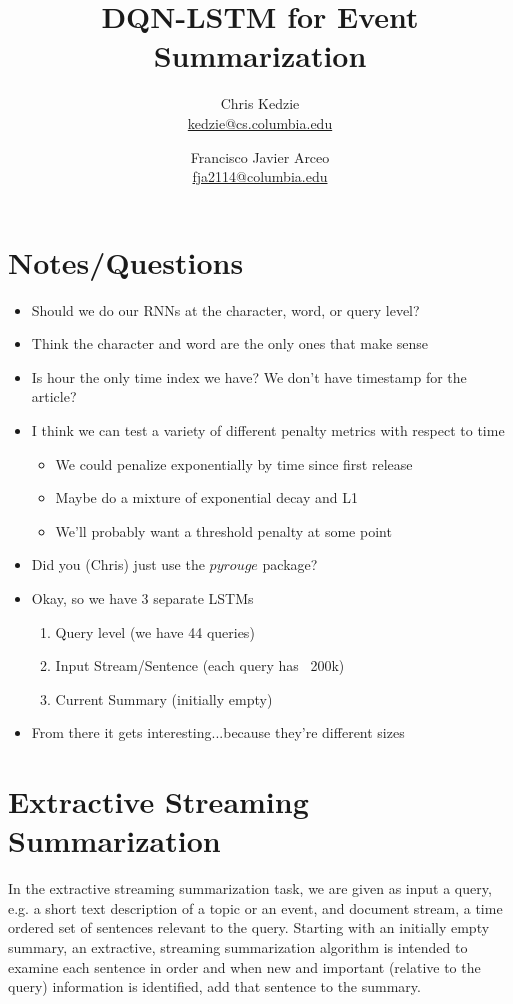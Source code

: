 \documentclass[12pt]{article}
\title{DQN-LSTM for Event Summarization}
\author{
	Chris Kedzie \\ \href{mailto: kedzie@cs.columbia.edu}{\small kedzie@cs.columbia.edu} 
		\and  
	Francisco Javier Arceo \\ \href{mailto: fja2114@columbia.edu}{\small fja2114@columbia.edu} 
	}
\begin{document}
\maketitle




\section{Notes/Questions}
\begin{itemize}
\item Should we do our RNNs at the character, word, or query level?
\item Think the character and word are the only ones that make sense
\item Is hour the only time index we have? We don't have timestamp for the article?
\item I think we can test a variety of different penalty metrics with respect to time
	\begin{itemize}
		\item We could penalize exponentially by time since first release
		\item Maybe do a mixture of exponential decay and L1
		\item We'll probably want a threshold penalty at some point
	\end{itemize}
\item Did you (Chris) just use the $pyrouge$ package?
\item Okay, so we have 3 separate LSTMs
	\begin{enumerate}
		\item Query level  (we have 44 queries)
		\item Input Stream/Sentence (each query has ~200k)
		\item Current Summary (initially empty)
	\end{enumerate}
\item From there it gets interesting...because they're different sizes
\end{itemize}

\section{Extractive Streaming Summarization}

  In the extractive streaming summarization task, we are given as input
  a query, e.g. a short text description of a topic or an event, and 
  document stream, a time ordered set of sentences 
  relevant to the query. Starting with an initially empty summary,  
  an extractive, streaming summarization algorithm is intended to 
  examine each sentence in order and when new and important (relative to the 
  query) information is identified, add that sentence to the summary. 
\end{document}
